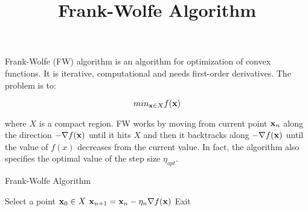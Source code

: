 \documentclass{article}
\title{Frank-Wolfe Algorithm}
\begin{document}
\maketitle

Frank-Wolfe (FW) algorithm is an algorithm for optimization of convex functions. It is iterative, computational and needs first-order derivatives. The problem is to:

\begin{equation}
	min_{{\bf x} \in X} f({\bf x})
\end{equation}

where $X$ is a compact region. FW works by moving from current point ${\bf x}_n$ along the direction $-\nabla f({\bf x})$ until it hits $X$ and then it backtracks along $-\nabla f({\bf x})$ until the value of $f(x)$ decreases from the current value. In fact, the algorithm also specifies the optimal value of the  step size $\eta_{opt}$.

\begin{algorithm}
\caption{Frank-Wolfe Algorithm}\label{fw_algo}
\begin{algorithmic}
\STATE Select a point ${\bf x}_0 \in X$ 
\STATE ${\bf x}_{n + 1} = {\bf x}_{n} - \eta_{n}\nabla f({\bf x}) $ 
\STATE Exit
\ENDIF
\ENDFOR
\end{algorithmic}
\end{algorithm}

\newpage

\end{document}
